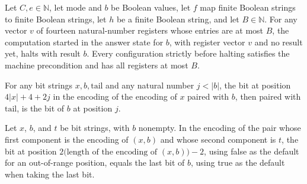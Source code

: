 \begin{lemma}
\label{Complexity.comp_ret}
\leanok
{}
Let $C,e\in\mathbb{N}$, let $\mathrm{mode}$ and $b$ be Boolean values, let $f$ map
finite Boolean strings to finite Boolean strings, let $h$ be a finite Boolean string,
and let $B\in\mathbb{N}$. For any vector $v$ of fourteen natural-number registers whose
entries are at most $B$, the computation started in the answer state for $b$, with
register vector $v$ and no result yet, halts with result $b$. Every configuration
strictly before halting satisfies the machine precondition and has all registers at most
$B$.
\end{lemma}

\begin{lemma}
\label{Complexity.comp_suffix_address}
\leanok
{}
For any bit strings $x,b,\mathrm{tail}$ and any natural number $j<|b|$, the bit at
position $4|x|+4+2j$ in the encoding of the encoding of $x$ paired with $b$, then paired
with $\mathrm{tail}$, is the bit of $b$ at position $j$.
\end{lemma}

\begin{lemma}
\label{Complexity.comp_last_address}
\leanok
{}
Let $x$, $b$, and $t$ be bit strings, with $b$ nonempty. In the encoding of the pair
whose first component is the encoding of $(x,b)$ and whose second component is $t$, the
bit at position $2\bigl(\text{length of the encoding of }(x,b)\bigr)-2$, using false as the
default for an out-of-range position, equals the last bit of $b$, using true as the
default when taking the last bit.
\end{lemma}

